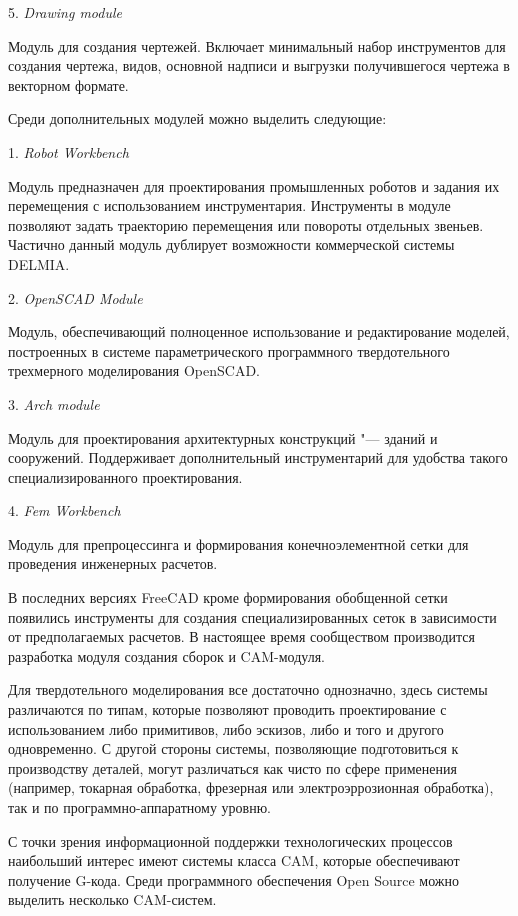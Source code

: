 5. \textit{Drawing module}

Модуль для создания чертежей. Включает минимальный набор инструментов для создания чертежа, видов, основной надписи и выгрузки получившегося чертежа в векторном формате.

Среди дополнительных модулей можно выделить следующие:

1. \textit{Robot Workbench}

Модуль предназначен для проектирования промышленных роботов и задания их перемещения с использованием инструментария. Инструменты в модуле позволяют задать траекторию перемещения или повороты отдельных звеньев. Частично данный модуль дублирует возможности коммерческой системы DELMIA.

2. \textit{OpenSCAD Module}

Модуль, обеспечивающий полноценное использование и редактирование моделей, построенных в системе параметрического программного твердотельного трехмерного моделирования OpenSCAD.

3. \textit{Arch module}

Модуль для проектирования архитектурных конструкций "--- зданий и сооружений. Поддерживает дополнительный инструментарий для удобства такого специализированного проектирования.

4. \textit{Fem Workbench}

Модуль для препроцессинга и формирования конечноэлементной сетки для проведения инженерных расчетов.

В последних версиях FreeCAD кроме формирования обобщенной сетки появились инструменты для создания специализированных сеток в зависимости от предполагаемых расчетов. В настоящее время сообществом производится разработка модуля создания сборок и CAM-модуля.

Для твердотельного моделирования все достаточно однозначно, здесь системы различаются по типам, которые позволяют проводить проектирование с использованием либо примитивов, либо эскизов, либо и того и другого одновременно. С другой стороны системы, позволяющие подготовиться к производству деталей, могут различаться как чисто по сфере применения (например, токарная обработка, фрезерная или электроэррозионная обработка), так и по программно-аппаратному уровню.

С точки зрения информационной поддержки технологических процессов наибольший интерес имеют системы класса CAM, которые обеспечивают получение G-кода. Среди программного обеспечения Open Source можно выделить несколько CAM-систем.

